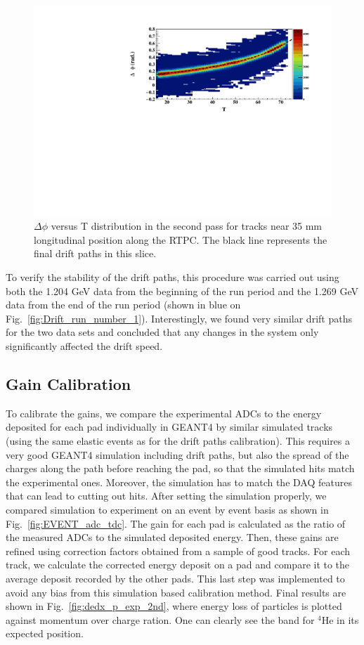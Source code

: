 \documentclass[preprint,5p]{elsarticle}
\begin{document}
\begin{figure}[tb]
\centering
\includegraphics[scale=0.42]{fig_2017/FitResult_p2_11.pdf}
\caption{$\Delta \phi$ versus T distribution in the second pass for tracks
near 35 mm longitudinal position along the RTPC. The black line represents 
the final drift paths in this slice.}
\label{fig:DELTA_PHI_TDC}
\end{figure}

To verify the stability of the drift paths, this procedure was carried out 
using both the 1.204 GeV data from the beginning of the run period and the 
1.269 GeV data from the end of the run period (shown in blue on 
Fig.~\ref{fig:Drift_run_number_1}). Interestingly, we found very similar drift paths
for the two data sets and concluded that any changes in the system only
significantly affected the drift speed.

\subsection{Gain Calibration}

To calibrate the gains, we compare the experimental ADCs to the energy deposited 
for each pad individually in GEANT4 by similar simulated tracks (using the 
same elastic events as for the drift 
paths calibration). This requires a very good GEANT4 simulation 
including drift paths, but also the spread of the charges along the path
before reaching the pad, so that the simulated hits match the experimental 
ones. Moreover, the simulation has to match the DAQ features 
that can lead to cutting out hits. After setting the simulation properly, we 
compared simulation to experiment on an event by event basis as shown in 
Fig.~\ref{fig:EVENT_adc_tdc}. The gain for each pad is calculated 
as the ratio of the measured ADCs to the simulated deposited energy.  
Then, these gains are refined using correction factors obtained from a 
sample of good tracks. For each track, we calculate the corrected 
energy deposit on a pad and compare it to the average
deposit recorded by the other pads. This last step was implemented to 
avoid any bias from this simulation based calibration method.
Final results are shown in Fig.~\ref{fig:dedx_p_exp_2nd}, where energy 
loss of particles is plotted against momentum over charge ration. One can 
clearly see the band for $^4$He in its expected position.
\end{document}

